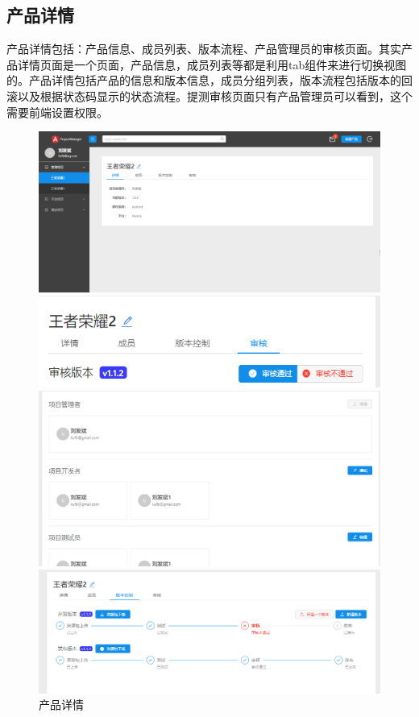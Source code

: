 \subsection{产品详情}
产品详情包括：产品信息、成员列表、版本流程、产品管理员的审核页面。其实产品详情页面是一个页面，产品信息，成员列表等都是利用tab组件来进行切换视图的。产品详情包括产品的信息和版本信息，成员分组列表，版本流程包括版本的回滚以及根据状态码显示的状态流程。提测审核页面只有产品管理员可以看到，这个需要前端设置权限。
\begin{figure}[h]
	\centering
	\includegraphics[width=\textwidth]{image/result/detail.png}
	
	\includegraphics[width=\textwidth]{image/result/check.png}
	
	\includegraphics[width=\textwidth]{image/result/member.png}
	
	\includegraphics[width=\textwidth]{image/result/versionflow.png}
	\caption{产品详情}
	\label{fig:detail}
\end{figure}

